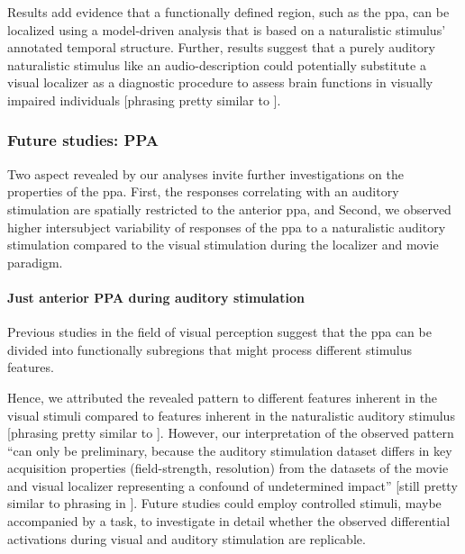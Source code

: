 Results add evidence \citep[cf.][]{bartels2004mapping} that a functionally
defined region, such as the \ac{ppa}, can be localized using a model-driven
analysis that is based on a naturalistic stimulus' annotated temporal structure.
Further, results suggest that a purely auditory naturalistic stimulus like an
audio-description could potentially substitute a visual localizer as a
diagnostic procedure to assess brain functions in visually impaired individuals
[phrasing pretty similar to \citep{haeusler2022processing}].


\subsubsection{Future studies: PPA}


%
Two aspect revealed by our analyses invite further investigations on the
properties of the \ac{ppa}.
%
First, the responses correlating with an auditory stimulation are spatially
restricted to the anterior \ac{ppa}, and
%
Second, we observed higher intersubject variability of responses of the \ac{ppa}
to a naturalistic auditory stimulation compared to the visual stimulation during
the localizer and movie paradigm.


\paragraph{Just anterior PPA during auditory stimulation}

Previous studies in the field of visual perception suggest that the \ac{ppa} can
be divided into functionally subregions that might process different stimulus
features.


%
Hence, we attributed the revealed pattern to different features inherent in the
visual stimuli compared to features inherent in the naturalistic auditory
stimulus [phrasing pretty similar to \citep{haeusler2022processing}].
%
However, our interpretation of the observed pattern ``can only be preliminary,
because the auditory stimulation dataset differs in key acquisition properties
(field-strength, resolution) from the datasets of the movie and visual localizer
representing a confound of undetermined impact'' [still pretty similar to
phrasing in \citep{haeusler2022processing}].
Future studies could employ controlled stimuli, maybe accompanied by a task, to
investigate in detail whether the observed differential activations during
visual and auditory stimulation are replicable.


